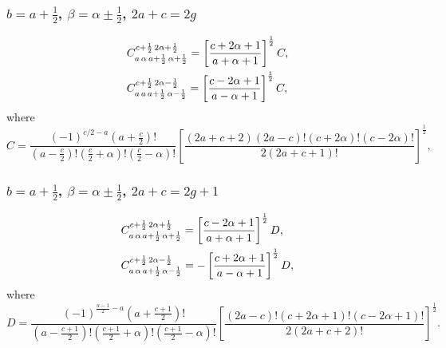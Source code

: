 \subsubsection{$b=a+\frac{1}{2}$, $\beta=\alpha \pm \frac{1}{2}$, $2 a+c=2 g$}
\begin{align}
& C_{a\,\alpha\,a+\frac{1}{2}\,\alpha+\frac{1}{2}}^{c+\frac{1}{2}\,2 \alpha+\frac{1}{2}}=\left[\frac{c+2 \alpha+1}{a+\alpha+1}\right]^{\frac{1}{2}} C, \label{eq:8:5:24}\\
& C_{a\,a\,a+\frac{1}{2}\,\alpha-\frac{1}{2}}^{c+\frac{1}{2}\,2 \alpha-\frac{1}{2}}=\left[\frac{c-2 \alpha+1}{a-\alpha+1}\right]^{\frac{1}{2}} C, \notag
\end{align}
where
\begin{equation}
C=\frac{(-1)^{c / 2-a}\left(a+\frac{c}{2}\right)!}{\left(a-\frac{c}{2}\right)!\left(\frac{c}{2}+\alpha\right)!\left(\frac{c}{2}-\alpha\right)!}\left[\frac{(2 a+c+2)(2 a-c)!(c+2 \alpha)!(c-2 \alpha)!}{2(2 a+c+1)!}\right]^{\frac{1}{2}}, \label{eq:8:5:25}
\end{equation}
\subsubsection{$b=a+\frac{1}{2}$, $\beta=\alpha \pm \frac{1}{2}$, $2 a+c=2 g+1$}
\begin{align}
& C_{a\,\alpha\,a+\frac{1}{2}\,\alpha+\frac{1}{2}}^{c+\frac{1}{2}\,2 \alpha+\frac{1}{2}}=\left[\frac{c-2 \alpha+1}{a+\alpha+1}\right]^{\frac{1}{2}} D, \notag\\
& C_{a\,\alpha\,a+\frac{1}{2}\,\alpha-\frac{1}{2}}^{c+\frac{1}{2}\,2 \alpha-\frac{1}{2}}=-\left[\frac{c+2 \alpha+1}{a-\alpha+1}\right]^{\frac{1}{2}} D, \label{eq:8:5:26}
\end{align}
where
\begin{equation}
D=\frac{(-1)^{\frac{a-1}{2}-a}\left(a+\frac{c+1}{2}\right)!}{\left(a-\frac{c+1}{2}\right)!\left(\frac{c+1}{2}+\alpha\right)!\left(\frac{c+1}{2}-\alpha\right)!}\left[\frac{(2 a-c)!(c+2 \alpha+1)!(c-2 \alpha+1)!}{2(2 a+c+2)!}\right]^{\frac{1}{2}}. \label{eq:8:5:27}
\end{equation}
